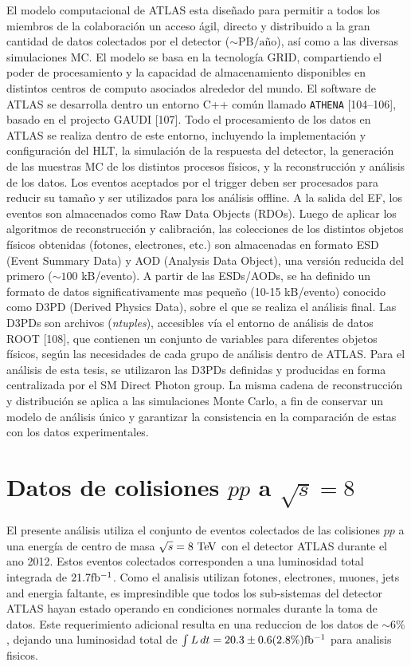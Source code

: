 El modelo computacional de ATLAS esta diseñado para permitir a todos los
miembros de la colaboración un acceso ágil, directo y distribuido a la gran
cantidad de datos colectados por el detector ($\sim \text{PB}/\text{a\~no}$),
así como a las diversas simulaciones MC. El modelo se basa en la tecnología
GRID, compartiendo el poder de procesamiento y la capacidad de almacenamiento
disponibles en distintos centros de computo asociados alrededor del mundo. El
software de ATLAS se desarrolla dentro un entorno C++ común llamado
\texttt{ATHENA} [104–106], basado en el projecto GAUDI [107]. Todo el
procesamiento de los datos en ATLAS se realiza dentro de este entorno,
incluyendo la implementación y configuración del HLT, la simulación de la
respuesta del detector, la generación de las muestras MC de los distintos
procesos físicos, y la reconstrucción y análisis de los datos. Los eventos
aceptados por el trigger deben ser procesados para reducir su tamaño y ser
utilizados para los análisis offline. A la salida del EF, los eventos son
almacenados como Raw Data Objects (RDOs). Luego de aplicar los algoritmos de
reconstrucción y calibración, las colecciones de los distintos objetos físicos
obtenidas (fotones, electrones, etc.) son almacenadas en formato ESD (Event
Summary Data) y AOD (Analysis Data Object), una versión reducida del primero
($\sim 100$ kB/evento). A partir de las ESDs/AODs, se ha definido un formato de
datos significativamente mas pequeño (10-15 kB/evento) conocido como D3PD
(Derived Physics Data), sobre el que se realiza el análisis final. Las D3PDs son
archivos (\emph{ntuples}), accesibles vía el entorno de análisis de datos ROOT
[108], que contienen un conjunto de variables para diferentes objetos físicos,
según las necesidades de cada grupo de análisis dentro de ATLAS. Para el
análisis de esta tesis, se utilizaron las D3PDs definidas y producidas en forma
centralizada por el SM Direct Photon group. La misma cadena de reconstrucción y
distribución se aplica a las simulaciones Monte Carlo, a fin de conservar un
modelo de análisis único y garantizar la consistencia en la comparación de estas
con los datos experimentales.


\section{Datos de colisiones $pp$ a $\sqrt{s} = 8$ \tev}

El presente análisis utiliza el conjunto de eventos colectados de las
colisiones $pp$ a una energía de centro de masa $\sqrt{s} = 8\tev$ con el
detector ATLAS durante el ano 2012.
Estos eventos colectados corresponden a una luminosidad total integrada de
$21.7 \mbox{fb$^{-1}$}$. Como el analisis utilizan fotones, electrones, muones, jets and energia faltante,
es impresindible que todos los sub-sistemas del detector ATLAS hayan estado
operando en condiciones normales durante la toma de datos. Este requerimiento
adicional resulta en una reduccion de los datos de $\sim 6\%$, dejando una luminosidad
total de $\int L\, dt = 20.3 \pm 0.6 (2.8 \%) \mbox{fb$^{-1}$}$\cite{lumi2012} para analisis fisicos.

